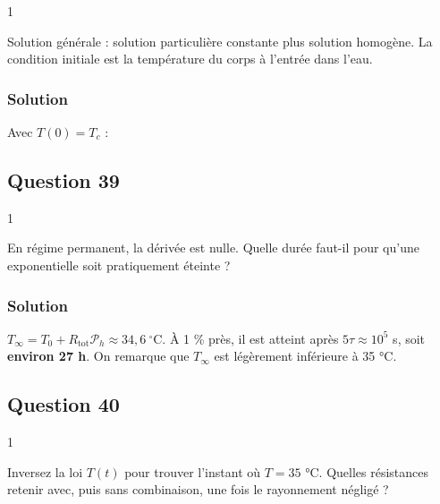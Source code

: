 \documentclass[11pt,a4paper]{article}
\newcommand{\equationajustee}[1]{%
  \sbox{\boiteequation}{$\displaystyle #1$}%
  \ifdim\wd\boiteequation>\linewidth
    \[\resizebox{\linewidth}{!}{\usebox{\boiteequation}}\]%
  \else
    \[#1\]%
  \fi}
\begin{document}
\begin{indication}{1}

Solution générale : solution particulière constante plus solution homogène. La condition initiale est la température du corps à l'entrée dans l'eau.

\end{indication}

\hypertarget{solution-37}{%
\subsubsection{Solution}\label{solution-37}}

Avec \(T(0) = T_c\) :

\equationajustee{\boxed{T(t) = \xi\tau + (T_c - \xi\tau)\,e^{-t/\tau}}}

\hypertarget{question-39}{%
\subsection{Question 39}\label{question-39}}

\begin{indication}{1}

En régime permanent, la dérivée est nulle. Quelle durée faut-il pour qu'une exponentielle soit pratiquement éteinte ?

\end{indication}

\hypertarget{solution-38}{%
\subsubsection{Solution}\label{solution-38}}

\(\boxed{T_\infty = T_0 + R_{\text{tot}}\mathcal P_h \approx 34{,}6\ ^\circ\mathrm C}\). À 1 \% près, il est atteint après \(5\tau \approx 10^5\) s, soit \textbf{environ 27 h}. On remarque que \(T_\infty\) est légèrement inférieure à 35 °C.

\hypertarget{question-40}{%
\subsection{Question 40}\label{question-40}}

\begin{indication}{1}

Inversez la loi \(T(t)\) pour trouver l'instant où \(T = 35\) °C. Quelles résistances retenir avec, puis sans combinaison, une fois le rayonnement négligé ?

\end{indication}
\end{document}
